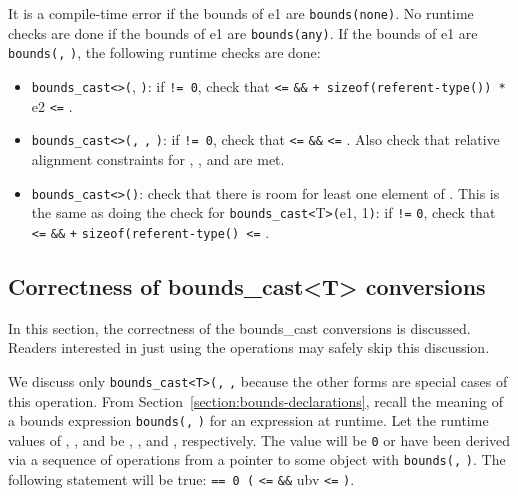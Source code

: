 It is a compile-time error if the bounds of e1 are
\texttt{bounds(none)}. No runtime checks are done if the bounds of e1
are \texttt{bounds(any)}. If the bounds of e1 are
\texttt{bounds(}\texttt{,} \texttt{)}, the following
runtime checks are done:

\begin{itemize}
\item
  \texttt{bounds\_cast\textless{}}\texttt{\textgreater{}(},
  \texttt{)}: if  \texttt{!= 0}, check that 
  \texttt{\textless{}=}  \texttt{\&\&}  \texttt{+
  sizeof(referent-type(}\texttt{)) *} e2 \texttt{\textless{}=}
  .
\item
  \texttt{bounds\_cast\textless{}}\texttt{\textgreater{}(}\texttt{,}
  \texttt{,} \texttt{)}: if  \texttt{!= 0},
  check that  \texttt{\textless{}=}  \texttt{\&\&}
   \texttt{\textless{}=} . Also check that relative
  alignment constraints for , , and  are met.
\item
  \texttt{bounds\_cast\textless{}}\texttt{\textgreater{}(}\texttt{)}:
  check that there is room for least one element of . This is
  the same as doing the check for
  \texttt{bounds\_cast\textless{}}T\texttt{\textgreater{}(}e1,
  1\texttt{)}: if  \texttt{!=} \texttt{0}, check that 
  \texttt{\textless{}=}  \texttt{\&\&}  \texttt{+}
  \texttt{sizeof(referent-type(}\texttt{) \textless{}=}
  .
\end{itemize}

\subsection{Correctness of bounds\_cast\textless{}T\textgreater{} conversions}
\label{correctness-of-boundsux5fcastt-conversions}

In this section, the correctness of the bounds\_cast conversions is
discussed. Readers interested in just using the operations may safely
skip this discussion.

We discuss only
\texttt{bounds\_cast\textless{}T\textgreater{}(}\texttt{,}
\texttt{,}  because the other forms are special cases
of this operation. From Section~\ref{section:bounds-declarations},
recall the meaning of a bounds
expression \texttt{bounds(}\texttt{,} \texttt{)} for
an expression  at runtime. Let the runtime values of ,
, and  be , , and ,
respectively. The value  will be \texttt{0} or have been
derived via a sequence of operations from a pointer to some object
 with \texttt{bounds(}\texttt{,}
\texttt{)}. The following statement will be true: 
\texttt{== 0 \textbar{}\textbar{} (} \texttt{\textless{}=}
 \texttt{\&\&} ubv \texttt{\textless{}=}
\texttt{)}.

